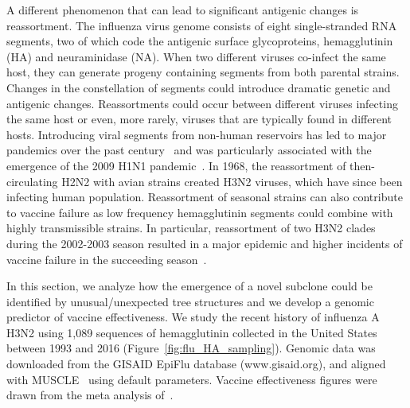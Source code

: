 \documentclass[a4paper,11pt]{article}
\begin{document}
A different phenomenon that can lead to significant antigenic changes is reassortment.
The influenza virus genome consists of eight single-stranded RNA segments, two of which code the antigenic surface glycoproteins, hemagglutinin (HA) and neuraminidase (NA).
When two different viruses co-infect the same host, they can generate  progeny containing segments from both parental strains.
Changes in the constellation of segments could introduce dramatic genetic and antigenic changes.
Reassortments could occur between different viruses infecting the same host or even, more rarely, viruses that are typically found in different hosts.
Introducing viral segments from non-human reservoirs has led to major pandemics over the past century~\cite{rabadan2007evolution, rabadan2008non} and was particularly associated with the emergence of the 2009 H1N1 pandemic~\cite{trifonov2009geographic, solovyov2009cluster}.
In 1968, the reassortment of then-circulating H2N2 with avian strains created H3N2 viruses, which have since been infecting human population.
Reassortment of seasonal strains can also contribute to vaccine failure as low frequency hemagglutinin segments could combine with highly transmissible strains.
In particular, reassortment of two H3N2 clades during the 2002-2003 season resulted in a major epidemic and higher incidents of vaccine failure in the succeeding season~\cite{centers2004preliminary}.

In this section, we analyze how the emergence of a novel subclone could be identified by unusual/unexpected tree structures and we develop a genomic predictor of vaccine effectiveness.
We study the recent history of influenza A H3N2 using 1,089 sequences of hemagglutinin collected in the United States between 1993 and 2016 (Figure~\ref{fig:flu_HA_sampling}).
Genomic data was downloaded from the GISAID EpiFlu database (www.gisaid.org), and aligned with MUSCLE~\cite{edgar2004muscle} using default parameters.
Vaccine effectiveness figures were drawn from the meta analysis of~\cite{gupta2006quantifying}.
\end{document}
